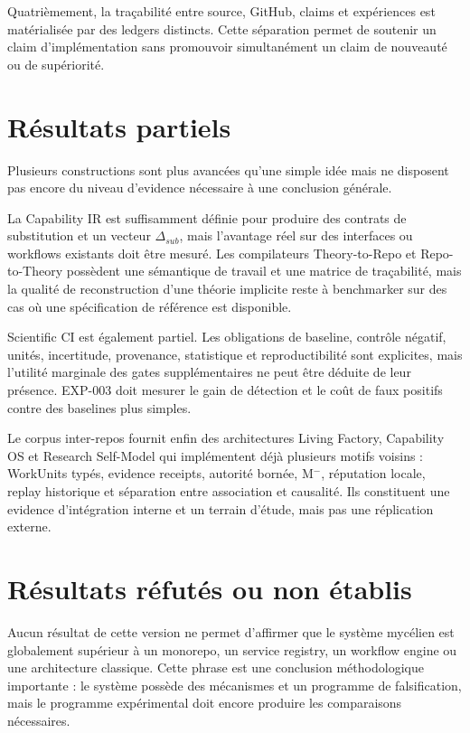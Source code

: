 Quatrièmement, la traçabilité entre source, GitHub, claims et expériences est matérialisée par des ledgers distincts. Cette séparation permet de soutenir un claim d'implémentation sans promouvoir simultanément un claim de nouveauté ou de supériorité.

\section{Résultats partiels}

Plusieurs constructions sont plus avancées qu'une simple idée mais ne disposent pas encore du niveau d'evidence nécessaire à une conclusion générale.

La Capability IR est suffisamment définie pour produire des contrats de substitution et un vecteur $\Delta_{sub}$, mais l'avantage réel sur des interfaces ou workflows existants doit être mesuré. Les compilateurs Theory-to-Repo et Repo-to-Theory possèdent une sémantique de travail et une matrice de traçabilité, mais la qualité de reconstruction d'une théorie implicite reste à benchmarker sur des cas où une spécification de référence est disponible.

Scientific CI est également partiel. Les obligations de baseline, contrôle négatif, unités, incertitude, provenance, statistique et reproductibilité sont explicites, mais l'utilité marginale des gates supplémentaires ne peut être déduite de leur présence. EXP-003 doit mesurer le gain de détection et le coût de faux positifs contre des baselines plus simples.

Le corpus inter-repos fournit enfin des architectures Living Factory, Capability OS et Research Self-Model qui implémentent déjà plusieurs motifs voisins : WorkUnits typés, evidence receipts, autorité bornée, M$^-$, réputation locale, replay historique et séparation entre association et causalité. Ils constituent une evidence d'intégration interne et un terrain d'étude, mais pas une réplication externe.

\section{Résultats réfutés ou non établis}

Aucun résultat de cette version ne permet d'affirmer que le système mycélien est globalement supérieur à un monorepo, un service registry, un workflow engine ou une architecture classique. Cette phrase est une conclusion méthodologique importante : le système possède des mécanismes et un programme de falsification, mais le programme expérimental doit encore produire les comparaisons nécessaires.

